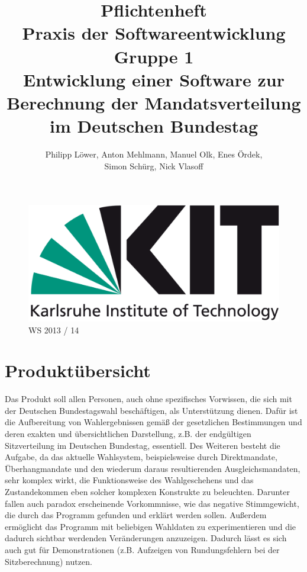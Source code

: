 \documentclass[10pt,a4paper]{article}
\title{\Huge Pflichtenheft\\[1cm] {\bfseries Praxis der Softwareentwicklung}\\Gruppe 1\\[2cm] Entwicklung einer Software zur Berechnung der Mandatsverteilung im Deutschen Bundestag\\[1cm] }
\author{Philipp Löwer, Anton Mehlmann, Manuel Olk, Enes Ördek, \\Simon Schürg, Nick Vlasoff}
\date{}
\begin{document}
\maketitle

\begin{figure}[h]

\centering
		
		\includegraphics[scale=0.6]{KIT-Logo.png}\\
		\Huge WS 2013 / 14
\end{figure}

		
\newpage
\tableofcontents
\newpage 

\section{Produktübersicht}
Das Produkt soll allen Personen, auch ohne spezifisches Vorwissen, die sich mit der Deutschen Bundestagswahl beschäftigen, als Unterstützung dienen.\newline
Dafür ist die Aufbereitung von Wahlergebnissen gemäß der gesetzlichen Bestimmungen und deren exakten und übersichtlichen Darstellung, z.B. der endgültigen Sitzverteilung im Deutschen Bundestag, essentiell. Des Weiteren besteht die Aufgabe, da das aktuelle Wahlsystem, beispielsweise durch Direktmandate, Überhangmandate und den wiederum daraus resultierenden Ausgleichsmandaten, sehr komplex wirkt, die Funktionsweise des Wahlgeschehens und das Zustandekommen eben solcher komplexen Konstrukte zu beleuchten. Darunter fallen auch paradox erscheinende Vorkommnisse, wie das negative Stimmgewicht, die durch das Programm gefunden und erklärt werden sollen. \newline
Außerdem ermöglicht das Programm mit beliebigen Wahldaten zu experimentieren und die dadurch sichtbar werdenden Veränderungen anzuzeigen. Dadurch lässt es sich auch gut für Demonstrationen (z.B. Aufzeigen von Rundungsfehlern bei der Sitzberechnung) nutzen.
\end{document}
